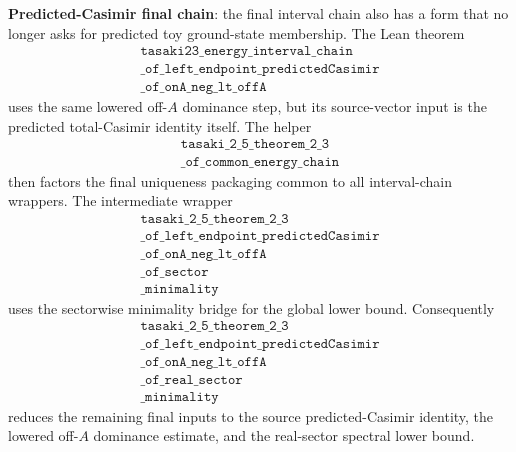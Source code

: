 \documentclass[a4paper,11pt]{article}
\begin{document}
\textbf{Predicted-Casimir final chain}: the final interval chain also has a
form that no longer asks for predicted toy ground-state membership.  The
Lean theorem
\[
\begin{gathered}
\texttt{tasaki23\_energy\_interval\_chain}\\
\texttt{\_of\_left\_endpoint\_predictedCasimir}\\
\texttt{\_of\_onA\_neg\_lt\_offA}
\end{gathered}
\]
uses the same lowered off-\(A\) dominance step, but its source-vector input
is the predicted total-Casimir identity itself.  The helper
\[
\begin{gathered}
\texttt{tasaki\_2\_5\_theorem\_2\_3}\\
\texttt{\_of\_common\_energy\_chain}
\end{gathered}
\]
then factors the final uniqueness packaging common to all interval-chain
wrappers.  The intermediate wrapper
\[
\begin{gathered}
\texttt{tasaki\_2\_5\_theorem\_2\_3}\\
\texttt{\_of\_left\_endpoint\_predictedCasimir}\\
\texttt{\_of\_onA\_neg\_lt\_offA}\\
\texttt{\_of\_sector}\\
\texttt{\_minimality}
\end{gathered}
\]
uses the sectorwise minimality bridge for the global lower bound.
Consequently
\[
\begin{gathered}
\texttt{tasaki\_2\_5\_theorem\_2\_3}\\
\texttt{\_of\_left\_endpoint\_predictedCasimir}\\
\texttt{\_of\_onA\_neg\_lt\_offA}\\
\texttt{\_of\_real\_sector}\\
\texttt{\_minimality}
\end{gathered}
\]
reduces the remaining final inputs to the source predicted-Casimir identity,
the lowered off-\(A\) dominance estimate, and the real-sector spectral lower
bound.
\end{document}
